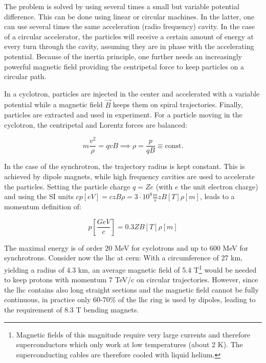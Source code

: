 \documentclass[encoding=utf8,british]{tumphthesis}
\begin{document}
The problem is solved by using several times a small but variable potential difference. This can be done using linear or circular  machines. In the latter, one can use several times the same acceleration (radio frequency) cavity. In the case of a circular accelerator, the particles will receive a certain amount of energy at every turn through the cavity, assuming they are in phase with the accelerating potential. Because of the inertia principle, one further needs an increasingly powerful magnetic field providing the centripetal force to keep particles on a circular path. 

In a cyclotron, particles are injected in the center and accelerated with a variable potential while a magnetic field $\vec{B}$ keeps them on spiral trajectories. Finally, particles are extracted and used in experiment. For a particle moving in the cyclotron, the centripetal and Lorentz forces are balanced:

\begin{equation}
    m \frac{v^2}{\rho} = q v B \implies     \rho = \frac{p}{qB} \equiv \text{const.}
\end{equation}


In the case of the synchrotron, the trajectory radius is kept constant. This is achieved by dipole magnets, while high frequency cavities are used to accelerate the particles. Setting the particle charge $q = Ze$ (with $e$ the unit electron charge) and using the SI units $cp[eV] = czB\rho = 3 \cdot 10^8 \frac{m}{s} zB[T]\rho[m]$, leads to a momentum definition of:

\begin{equation}
    p \left[\frac{GeV}{c}\right] = 0.3 Z B[T] \rho[m]
\end{equation}

The maximal energy is of order 20 MeV for cyclotrons and up to 600 MeV for synchrotrons. Consider now the \acrshort{lhc} at \acrshort{cern}: With a circumference of 27 km, yielding a radius of 4.3 km, an average magnetic field of 5.4 T\footnote{Magnetic fields of this magnitude require very large currents and therefore superconductors which only work at low temperatures (about 2 K). The superconducting cables are therefore cooled with liquid helium.} would be needed to keep protons with momentum 7 TeV/c on circular trajectories. However, since the \acrshort{lhc} contains also long straight sections and the magnetic field cannot be fully continuous, in practice only 60-70\% of the \acrshort{lhc} ring is used by dipoles, leading to the requirement of 8.3 T bending magnets.
\end{document}
